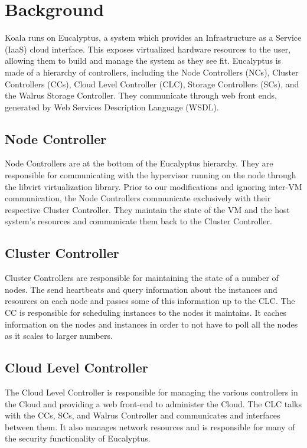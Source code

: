 \section{Background}

Koala runs on Eucalyptus, a system which provides an Infrastructure as a Service (IaaS) cloud interface.  This exposes virtualized hardware resources to the user, allowing them to build and manage the system as they see fit.  Eucalyptus is made of a hierarchy of controllers, including the Node Controllers (NCs), Cluster Controllers (CCs), Cloud Level Controller (CLC), Storage Controllers (SCs), and the Walrus Storage Controller.  They communicate through web front ends, generated by Web Services Description Language (WSDL).

\subsection{Node Controller}
Node Controllers are at the bottom of the Eucalyptus hierarchy.  They are responsible for communicating with the hypervisor running on the node through the libvirt virtualization library.  Prior to our modifications and ignoring inter-VM communication, the Node Controllers communicate exclusively with their respective Cluster Controller.  They maintain the state of the VM and the host system's resources and communicate them back to the Cluster Controller.

\subsection{Cluster Controller}
Cluster Controllers are responsible for maintaining the state of a number of nodes.  The send heartbeats and query information about the instances and resources on each node and passes some of this information up to the CLC.  The CC is responsible for scheduling instances to the nodes it maintains.  It caches information on the nodes and instances in order to not have to poll all the nodes as it scales to larger numbers.

\subsection{Cloud Level Controller}
The Cloud Level Controller is responsible for managing the various controllers in the Cloud and providing a web front-end to administer the Cloud.  The CLC talks with the CCs, SCs, and Walrus Controller and communicates and interfaces between them.  It also manages network resources and is responsible for many of the security functionality of Eucalyptus.

